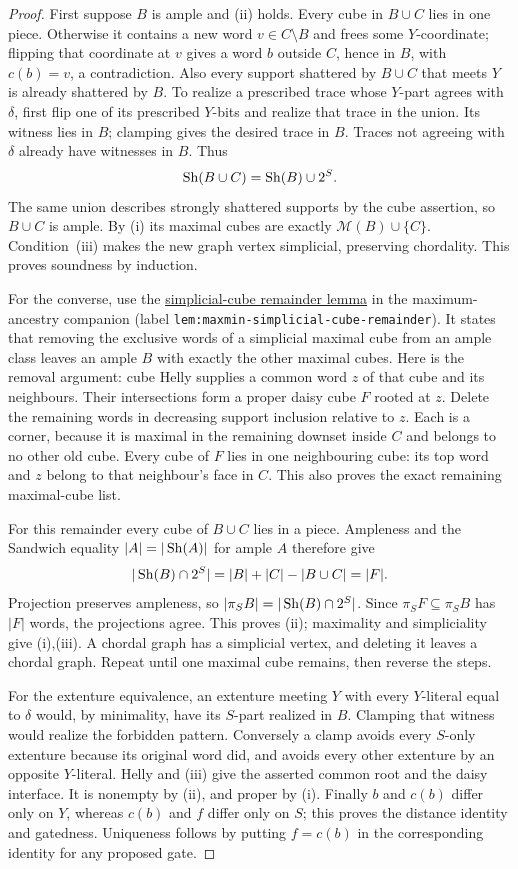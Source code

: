 \begin{proof}
First suppose $B$ is ample and (ii) holds. Every cube in $B\cup C$
lies in one piece. Otherwise it contains a new word $v\in C\setminus B$
and frees some $Y$-coordinate; flipping that coordinate at $v$ gives a
word $b$ outside $C$, hence in $B$, with $c(b)=v$, a contradiction.
Also every support shattered by $B\cup C$ that meets $Y$ is already
shattered by $B$. To realize a prescribed trace whose $Y$-part agrees
with $\delta$, first flip one of its prescribed $Y$-bits and realize that
trace in the union. Its witness lies in $B$; clamping gives the desired
trace in $B$. Traces not agreeing with $\delta$ already have witnesses
in $B$. Thus
\[
 \operatorname{Sh}(B\cup C)=\operatorname{Sh}(B)\cup2^S.
\]
The same union describes strongly shattered supports by the cube assertion,
so $B\cup C$ is ample. By (i) its maximal cubes are exactly
$\mathcal M(B)\cup\{C\}$. Condition~(iii) makes the new graph vertex
simplicial, preserving chordality. This proves soundness by induction.

For the converse, use the \href{../maxmin-forbidden/sections/chordal_guard_coefficients.tex}
{simplicial-cube remainder lemma} in the maximum-ancestry companion
(label \nolinkurl{lem:maxmin-simplicial-cube-remainder}).
It states that removing the exclusive words of a simplicial maximal cube
from an ample class leaves an ample $B$ with exactly the other maximal
cubes. Here is the removal argument: cube Helly supplies a common word
$z$ of that cube and its neighbours. Their intersections form a proper
daisy cube $F$ rooted at $z$. Delete the remaining words in decreasing
support inclusion relative to $z$. Each is a corner, because it is maximal
in the remaining downset inside $C$ and belongs to no other old cube.
Every cube of $F$ lies in one neighbouring cube: its top word and $z$
belong to that neighbour's face in $C$. This also proves the exact remaining
maximal-cube list.

For this remainder every cube of $B\cup C$ lies in a piece. Ampleness and
the Sandwich equality $|A|=|\operatorname{Sh}(A)|$ for ample $A$ therefore give
\[
 |\operatorname{Sh}(B)\cap2^S|=|B|+|C|-|B\cup C|=|F|.
\]
Projection preserves ampleness, so $|\pi_SB|=|\operatorname{Sh}(B)\cap2^S|$.
Since $\pi_SF\subseteq\pi_SB$ has $|F|$ words, the projections agree.
This proves (ii); maximality and simpliciality give (i),(iii).
A chordal graph has a simplicial vertex, and deleting it leaves a chordal
graph. Repeat until one maximal cube remains, then reverse the steps.

For the extenture equivalence, an extenture meeting $Y$ with every
$Y$-literal equal to $\delta$ would, by minimality, have its $S$-part
realized in $B$. Clamping that witness would realize the forbidden pattern.
Conversely a clamp avoids every $S$-only extenture because its original
word did, and avoids every other extenture by an opposite $Y$-literal.
Helly and (iii) give the asserted common root and the daisy interface.
It is nonempty by (ii), and proper by (i). Finally $b$ and $c(b)$ differ
only on $Y$, whereas $c(b)$ and $f$ differ only on $S$; this proves the
distance identity and gatedness. Uniqueness follows by putting $f=c(b)$
in the corresponding identity for any proposed gate.
\end{proof}

